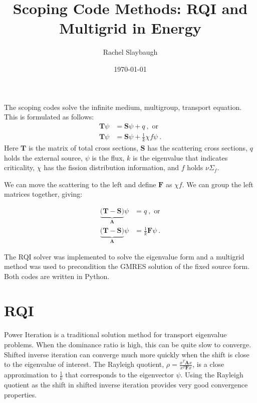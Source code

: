 \documentclass[12pt, letterpaper]{article}
\date{\today}
\title{Scoping Code Methods: RQI and Multigrid in Energy}
\author{Rachel Slaybaugh}
\newcommand{\ve}[1]{\ensuremath{\mathbf{#1}}}
\begin{document}
\maketitle

The scoping codes solve the infinite medium, multigroup, transport equation. This is formulated as follows:
\begin{align}
\ve{T}\psi &= \ve{S}\psi + q \:, \text{ or} \\
\ve{T}\psi &= \ve{S}\psi + \frac{1}{k}\chi f \psi \:.
\end{align}
Here $\ve{T}$ is the matrix of total cross sections, $\ve{S}$ has the scattering cross sections, $q$ holds the external source, $\psi$ is the flux, $k$ is the eigenvalue that indicates criticality, $\chi$ has the fission distribution information, and $f$ holds $\nu \Sigma_{f}$. 

We can move the scattering to the left and define $\ve{F}$ as $\chi f$. We can group the left matrices together, giving:

\begin{align}
  \underbrace{ \bigl( \ve{T} - \ve{S} \bigr) }_{\ve{A}} \psi &=  q \:, \text{ or} \\
 \underbrace{ \bigl( \ve{T-S} \bigr) }_{\ve{A}} \psi &= \frac{1}{k} \ve{F} \psi \:.
\label{eqn:rearranged}
\end{align}

The RQI solver was implemented to solve the eigenvalue form and a multigrid method was used to precondition the GMRES solution of the fixed source form. Both codes are written in Python.

\section{RQI}
Power Iteration is a traditional solution method for transport eigenvalue problems. When the dominance ratio is high, this can be quite slow to converge. Shifted inverse iteration can converge much more quickly when the shift is close to the eigenvalue of interest. The Rayleigh quotient, $\rho = \frac{x^{T}\ve{A}x}{x^{T}\ve{F}x}$, is a close approximation to $\frac{1}{k}$ that corresponds to the eigenvector $\psi$. Using the Rayleigh quotient as the shift in shifted inverse iteration provides very good convergence properties. 
\end{document}
